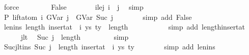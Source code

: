 \begin{isabellebody}
\ force\isanewline
\ \ \isamarkupfalse%
\isanewline
\ \ \ \ \isamarkupfalse%
\ False\isanewline
\ \ \ \ \isamarkupfalse%
\ \isamarkupfalse%
\ i{\isacharunderscore}{\kern0pt}le{\isacharunderscore}{\kern0pt}j{\isacharcolon}{\kern0pt}\ {\isachardoublequoteopen}i\ {\isasymle}\ j{\isachardoublequoteclose}\ \isamarkupfalse%
\ simp\isanewline
\isanewline
\ \ \ \ \isamarkupfalse%
\ P{}{\isacharcolon}{\kern0pt}\ {\isachardoublequoteopen}lift{\isacharunderscore}{\kern0pt}atom\ i\ {\isacharparenleft}{\kern0pt}GVar\ j{\isacharparenright}{\kern0pt}\ {\isacharequal}{\kern0pt}\ GVar\ {\isacharparenleft}{\kern0pt}Suc\ j{\isacharparenright}{\kern0pt}{\isachardoublequoteclose}\isanewline
\ \ \ \ \ \ \isamarkupfalse%
\ {\isacharparenleft}{\kern0pt}simp\ add{\isacharcolon}{\kern0pt}\ False{\isacharparenright}{\kern0pt}\isanewline
\isanewline
\ \ \ \ \isamarkupfalse%
\ len{\isacharunderscore}{\kern0pt}ins{\isacharcolon}{\kern0pt}\ {\isachardoublequoteopen}length\ {\isacharparenleft}{\kern0pt}insert{\isacharunderscore}{\kern0pt}at\ {\isasymGamma}\ i\ {\isacharparenleft}{\kern0pt}ys{\isacharcomma}{\kern0pt}\ ty{}{\isacharparenright}{\kern0pt}{\isacharparenright}{\kern0pt}\ {\isacharequal}{\kern0pt}\ length\ {\isasymGamma}\ {\isacharplus}{\kern0pt}\ {}{\isachardoublequoteclose}\isanewline
\ \ \ \ \ \ \isamarkupfalse%
\ {\isacharparenleft}{\kern0pt}simp\ add{\isacharcolon}{\kern0pt}\ length{\isacharunderscore}{\kern0pt}insert{\isacharunderscore}{\kern0pt}at{\isacharparenright}{\kern0pt}\isanewline
\isanewline
\ \ \ \ \isamarkupfalse%
\ j{\isacharunderscore}{\kern0pt}lt\ \isamarkupfalse%
\ {\isachardoublequoteopen}Suc\ j\ {\isasymle}\ length\ {\isasymGamma}{\isachardoublequoteclose}\isanewline
\ \ \ \ \ \ \isamarkupfalse%
\ simp\isanewline
\ \ \ \ \isamarkupfalse%
\ \isamarkupfalse%
\ Sucj{\isacharunderscore}{\kern0pt}lt{\isacharunderscore}{\kern0pt}ins{\isacharcolon}{\kern0pt}\ {\isachardoublequoteopen}Suc\ j\ {\isacharless}{\kern0pt}\ length\ {\isacharparenleft}{\kern0pt}insert{\isacharunderscore}{\kern0pt}at\ {\isasymGamma}\ i\ {\isacharparenleft}{\kern0pt}ys{\isacharcomma}{\kern0pt}\ ty{}{\isacharparenright}{\kern0pt}{\isacharparenright}{\kern0pt}{\isachardoublequoteclose}\isanewline
\ \ \ \ \ \ \isamarkupfalse%
\ {\isacharparenleft}{\kern0pt}simp\ add{\isacharcolon}{\kern0pt}\ len{\isacharunderscore}{\kern0pt}ins{\isacharparenright}{\kern0pt}\isanewline

\end{isabellebody}
